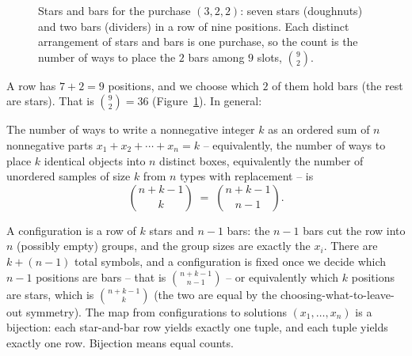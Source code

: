 \begin{figure}[H]
\centering
{}
\caption{Stars and bars for the purchase $(3,2,2)$: seven stars (doughnuts) and two bars
(dividers) in a row of nine positions. Each distinct arrangement of stars and bars is one
purchase, so the count is the number of ways to place the $2$ bars among $9$ slots,
$\binom{9}{2}$.}
\label{ch2:fig-starsbars}
\end{figure}

A row has $7 + 2 = 9$ positions, and we choose which $2$ of them hold bars (the rest are
stars). That is $\binom{9}{2} = 36$ (Figure~\ref{ch2:fig-starsbars}). In general:

\begin{theorem}
\label{ch2:thm-stars}
The number of ways to write a nonnegative integer $k$ as an ordered sum of $n$ nonnegative
parts $x_1 + x_2 + \cdots + x_n = k$ -- equivalently, the number of ways to place $k$
identical objects into $n$ distinct boxes, equivalently the number of unordered samples of
size $k$ from $n$ types with replacement -- is
\[
  \binom{n+k-1}{k} \;=\; \binom{n+k-1}{n-1}.
\]
\end{theorem}

\begin{whybox}
A configuration is a row of $k$ stars and $n-1$ bars: the $n-1$ bars cut the row into $n$
(possibly empty) groups, and the group sizes are exactly the $x_i$. There are $k + (n-1)$
total symbols, and a configuration is fixed once we decide which $n-1$ positions are bars --
that is $\binom{n+k-1}{n-1}$ -- or equivalently which $k$ positions are stars, which is
$\binom{n+k-1}{k}$ (the two are equal by the choosing-what-to-leave-out symmetry). The map
from configurations to solutions $(x_1,\dots,x_n)$ is a bijection: each star-and-bar row
yields exactly one tuple, and each tuple yields exactly one row. Bijection means equal
counts.
\end{whybox}

